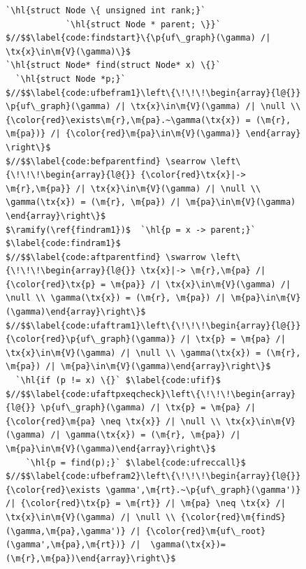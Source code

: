 \documentclass[acmsmall,screen]{acmart}
\newcommand{\tx}[1]{\text{#1}}
\newcommand{\p}[1]{\ensuremath{\mathsf{#1}}} \newcommand{\m}[1]{\ensuremath{\mathit{#1}}} \newcommand{\ma}[1]{\ensuremath{\mathcal{#1}}} \let\ramify\lightning
\newcommand{\hl}[1]{\colorbox{lightgray}{#1}}
\begin{document}
\begin{figure}[t]
\vspace{-1ex}
  \begin{lstlisting}[multicols=2]
`\hl{struct Node \{ unsigned int rank;}`
            `\hl{struct Node * parent; \}}`
$//$$\label{code:findstart}\{\p{uf\_graph}(\gamma) /| \tx{x}\in\m{V}(\gamma)\}$
`\hl{struct Node* find(struct Node* x) \{}`
  `\hl{struct Node *p;}`
$//$$\label{code:ufbefram1}\left\{\!\!\!\begin{array}{l@{}} \p{uf\_graph}(\gamma) /| \tx{x}\in\m{V}(\gamma) /| \null \\ {\color{red}\exists\m{r},\m{pa}.~\gamma(\tx{x}) = (\m{r}, \m{pa})} /| {\color{red}\m{pa}\in\m{V}(\gamma)} \end{array} \right\}$
$//$$\label{code:befparentfind} \searrow \left\{\!\!\!\begin{array}{l@{}} {\color{red}\tx{x}|-> \m{r},\m{pa}} /| \tx{x}\in\m{V}(\gamma) /| \null \\ \gamma(\tx{x}) = (\m{r}, \m{pa}) /| \m{pa}\in\m{V}(\gamma) \end{array}\right\}$
$\ramify(\ref{findram1})$  `\hl{p = x -> parent;}` $\label{code:findram1}$
$//$$\label{code:aftparentfind} \swarrow \left\{\!\!\!\begin{array}{l@{}} \tx{x}|-> \m{r},\m{pa} /| {\color{red}\tx{p} = \m{pa}} /| \tx{x}\in\m{V}(\gamma) /| \null \\ \gamma(\tx{x}) = (\m{r}, \m{pa}) /| \m{pa}\in\m{V}(\gamma)\end{array}\right\}$
$//$$\label{code:ufaftram1}\left\{\!\!\!\begin{array}{l@{}} {\color{red}\p{uf\_graph}(\gamma)} /| \tx{p} = \m{pa} /| \tx{x}\in\m{V}(\gamma) /| \null \\ \gamma(\tx{x}) = (\m{r}, \m{pa}) /| \m{pa}\in\m{V}(\gamma)\end{array}\right\}$
  `\hl{if (p != x) \{}` $\label{code:ufif}$
$//$$\label{code:ufaftpxeqcheck}\left\{\!\!\!\begin{array}{l@{}} \p{uf\_graph}(\gamma) /| \tx{p} = \m{pa} /| {\color{red}\m{pa} \neq \tx{x}} /| \null \\ \tx{x}\in\m{V}(\gamma) /| \gamma(\tx{x}) = (\m{r}, \m{pa}) /| \m{pa}\in\m{V}(\gamma)\end{array}\right\}$
    `\hl{p = find(p);}` $\label{code:ufreccall}$
$//$$\label{code:ufbefram2}\left\{\!\!\!\begin{array}{l@{}}{\color{red}\exists \gamma',\m{rt}.~\p{uf\_graph}(\gamma')} /| {\color{red}\tx{p} = \m{rt}} /| \m{pa} \neq \tx{x} /| \tx{x}\in\m{V}(\gamma) /| \null \\ {\color{red}\m{findS}(\gamma,\m{pa},\gamma')} /| {\color{red}\m{uf\_root}(\gamma',\m{pa},\m{rt})} /|  \gamma(\tx{x})=(\m{r},\m{pa})\end{array}\right\}$

\end{lstlisting}
\end{figure}
\end{document}
